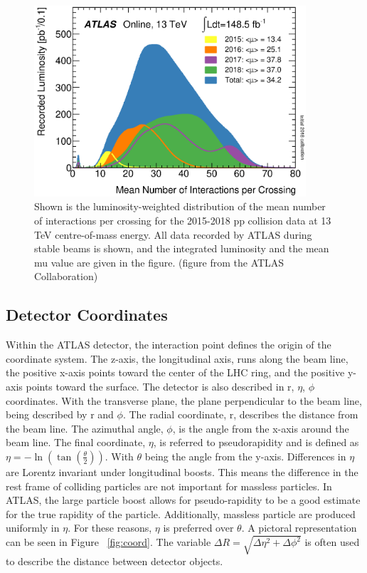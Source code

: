 \begin{figure}[H]
\begin{center}
\includegraphics*[width=0.90\textwidth] {figures/mu_2015_2018}%
\caption[Number of interactions per bunch crossing]{Shown is the luminosity-weighted distribution of the mean number of interactions per crossing for the 2015-2018 pp collision data at 13 TeV centre-of-mass energy. All data recorded by ATLAS during stable beams is shown, and the integrated luminosity and the mean mu value are given in the figure. (figure from the ATLAS Collaboration)}
\label{fig:mu}
\end{center}
\end{figure}

\subsection{Detector Coordinates}
Within the ATLAS detector, the interaction point defines the origin of the coordinate system. The z-axis, the longitudinal axis, runs along the beam line, the positive x-axis points toward the center of the LHC ring, and the positive y-axis points toward the surface. The detector is also described in r, ${\eta}$, ${\phi}$ coordinates. With the transverse plane, the plane perpendicular to the beam line, being described by r and ${\phi}$. The radial coordinate, r, describes the distance from the beam line. The azimuthal angle, ${\phi}$, is the angle from the x-axis around the beam line. The final coordinate, ${\eta}$, is referred to pseudorapidity and is defined as ${\eta = -\ln(\tan(\frac{\theta}{2}))}$. With ${\theta}$ being the angle from the y-axis. Differences in ${\eta}$ are Lorentz invariant under longitudinal boosts. This means the difference in the rest frame of colliding particles are not important for massless particles. In ATLAS, the large particle boost allows for pseudo-rapidity to be a good estimate for the true rapidity of the particle. Additionally, massless particle are produced uniformly in ${\eta}$. For these reasons, ${\eta}$ is preferred over ${\theta}$. A pictoral representation can be seen in Figure ~\ref{fig:coord}. The variable ${\Delta{R}=\sqrt{\Delta\eta^{2} + \Delta\phi^{2}}}$ is often used to describe the distance between detector objects.


